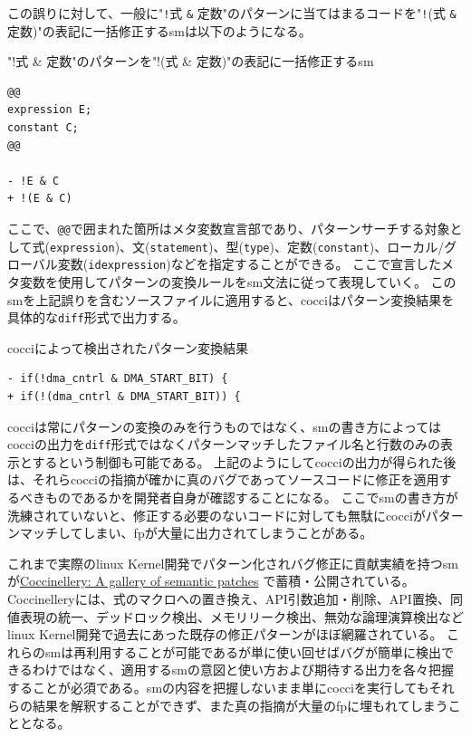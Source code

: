\par
この誤りに対して、一般に"\verb|!|式 \verb|&| 定数"のパターンに当てはまるコードを"\verb|!|(式 \verb|&| 定数)"の表記に一括修正する\acrshort{sm}は以下のようになる。
\begin{itembox}[l]{"!式 \& 定数"のパターンを"!(式 \& 定数)"の表記に一括修正する\acrshort{sm}}
\begin{verbatim}
@@
expression E;
constant C;
@@

- !E & C
+ !(E & C)
\end{verbatim}
\end{itembox}
\par
ここで、\verb|@@|で囲まれた箇所はメタ変数宣言部であり、パターンサーチする対象として式(\verb|expression|)、文(\verb|statement|)、型(\verb|type|)、定数(\verb|constant|)、ローカル/グローバル変数(\verb|idexpression|)などを指定することができる。
ここで宣言したメタ変数を使用してパターンの変換ルールを\acrshort{sm}文法に従って表現していく。
この\acrshort{sm}を上記誤りを含むソースファイルに適用すると、\acrshort{cocci}はパターン変換結果を具体的な\verb|diff|形式で出力する。
\begin{itembox}[l]{\acrshort{cocci}によって検出されたパターン変換結果}
\begin{verbatim}
- if(!dma_cntrl & DMA_START_BIT) {
+ if(!(dma_cntrl & DMA_START_BIT)) {
\end{verbatim}
\end{itembox}
\par
\acrshort{cocci}は常にパターンの変換のみを行うものではなく、\acrshort{sm}の書き方によっては\acrshort{cocci}の出力を\verb|diff|形式ではなくパターンマッチしたファイル名と行数のみの表示とするという制御も可能である。
上記のようにして\acrshort{cocci}の出力が得られた後は、それら\acrshort{cocci}の指摘が確かに真のバグであってソースコードに修正を適用するべきものであるかを開発者自身が確認することになる。
ここで\acrshort{sm}の書き方が洗練されていないと、修正する必要のないコードに対しても無駄に\acrshort{cocci}がパターンマッチしてしまい、\acrshort{fp}が大量に出力されてしまうことがある。
\par
これまで実際の\acrshort{linux} Kernel開発でパターン化されバグ修正に貢献実績を持つ\acrshort{sm}が\href{http://coccinellery.org/}{Coccinellery: A gallery of semantic patches} \cite{coccine}で蓄積・公開されている。
Coccinelleryには、式のマクロへの置き換え、API引数追加・削除、API置換、同値表現の統一、デッドロック検出、メモリリーク検出、無効な論理演算検出など\acrshort{linux} Kernel開発で過去にあった既存の修正パターンがほぼ網羅されている。
これらの\acrshort{sm}は再利用することが可能であるが単に使い回せばバグが簡単に検出できるわけではなく、適用する\acrshort{sm}の意図と使い方および期待する出力を各々把握することが必須である。\acrshort{sm}の内容を把握しないまま単に\acrshort{cocci}を実行してもそれらの結果を解釈することができず、また真の指摘が大量の\acrshort{fp}に埋もれてしまうこととなる。
